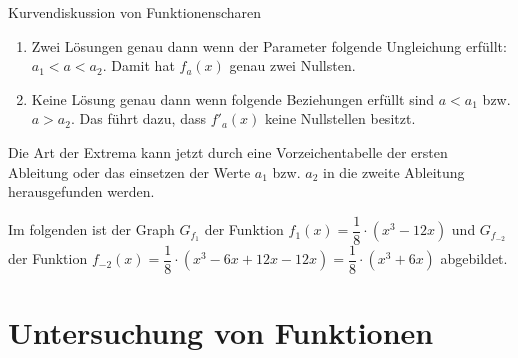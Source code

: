 \begin{bsp}{Kurvendiskussion von Funktionenscharen}{}
\begin{itemize}
\begin{enumerate}
\item Zwei Lösungen genau dann wenn der Parameter folgende Ungleichung erfüllt: $a_1<a<a_2$. Damit hat $f_a(x)$ genau zwei Nullsten.
\item Keine Lösung genau dann wenn folgende Beziehungen erfüllt sind $a<a_1$ bzw. $a>a_2$. Das führt dazu, dass $f'_a(x)$ keine Nullstellen besitzt.
    \end{enumerate}
Die Art der Extrema kann jetzt durch eine Vorzeichentabelle der ersten Ableitung oder das einsetzen der Werte $a_1$ bzw. $a_2$ in die zweite Ableitung herausgefunden werden. 
\end{itemize}
Im folgenden ist der Graph $G_{f_1}$ der Funktion $f_1(x) = \dfrac{1}{8}\cdot(x^3-12x)$ und $G_{f_{-2}}$  der Funktion $f_{-2}(x)= \dfrac{1}{8} \cdot(x^3 -6x+12x-12x) = \dfrac{1}{8}\cdot(x^3+6x)$ abgebildet.
\begin{center}
\end{center}
\end{bsp}
\section{Untersuchung von Funktionen}
